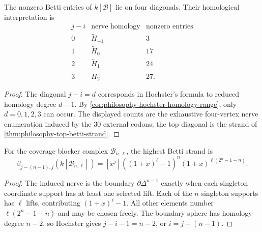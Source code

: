 \begin{theorem}
\label{thm:philosophy-betti-diagonal-compression}
The nonzero Betti entries of $k[\mathcal{B}]$ lie on four diagonals.
Their homological interpretation is
$$
\begin{array}{c|c|r}
  j-i & \text{nerve homology} & \text{nonzero entries}\\
  \hline
  0 & \widetilde{H}_{-1} & 3\\
  1 & \widetilde{H}_{0} & 17\\
  2 & \widetilde{H}_{1} & 24\\
  3 & \widetilde{H}_{2} & 27.
\end{array}
$$
\end{theorem}
\begin{proof}
The diagonal $j-i=d$ corresponds in Hochster's formula to reduced
homology degree $d-1$. By
\autoref{cor:philosophy-hochster-homology-range}, only
$d=0,1,2,3$ can occur. The displayed counts are the exhaustive
four-vertex nerve enumeration induced by the $30$ external codons; the
top diagonal is the strand of
\autoref{thm:philosophy-top-betti-strand}.
\end{proof}

\begin{theorem}
\label{thm:philosophy-universal-top-betti-strand}
For the coverage blocker complex $\mathcal{B}_{n,\ell}$, the highest
Betti strand is
$$
  \beta_{j-(n-1),j}(k[\mathcal{B}_{n,\ell}])
  =
  [x^{j}]
  \left((1+x)^{\ell}-1\right)^{n}
  (1+x)^{\ell(2^{n}-1-n)}.
$$
\end{theorem}
\begin{proof}
The induced nerve is the boundary $\partial\Delta^{n-1}$ exactly when
each singleton coordinate support has at least one selected lift. Each
of the $n$ singleton supports has $\ell$ lifts, contributing
$(1+x)^{\ell}-1$. All other elements number
$\ell(2^{n}-1-n)$ and may be chosen freely. The boundary sphere has
homology degree $n-2$, so Hochster gives $j-i-1=n-2$, or
$i=j-(n-1)$.
\end{proof}

